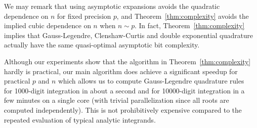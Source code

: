\documentclass[11pt,a4paper]{article}
\begin{document}
We may remark that using asymptotic expansions avoids the quadratic
dependence on $n$ for fixed precision $p$, and Theorem~\ref{thm:complexity}
avoids the implied cubic dependence on $n$ when $n \sim p$.
In fact, Theorem~\ref{thm:complexity} implies that
Gauss-Legendre, Clenshaw-Curtis and double exponential
quadrature actually have the same quasi-optimal asymptotic bit complexity.

Although our experiments show that the algorithm in Theorem~\ref{thm:complexity}
hardly is practical, our main algorithm does achieve a
significant speedup for practical $p$ and $n$
which allows us to compute Gauss-Legendre quadrature rules for
1000-digit integration in about a second and for 10000-digit integration in a few minutes
on a single core (with trivial parallelization since all roots
are computed independently). This is not prohibitively
expensive compared to the repeated evaluation
of typical analytic integrands.



\end{document}
